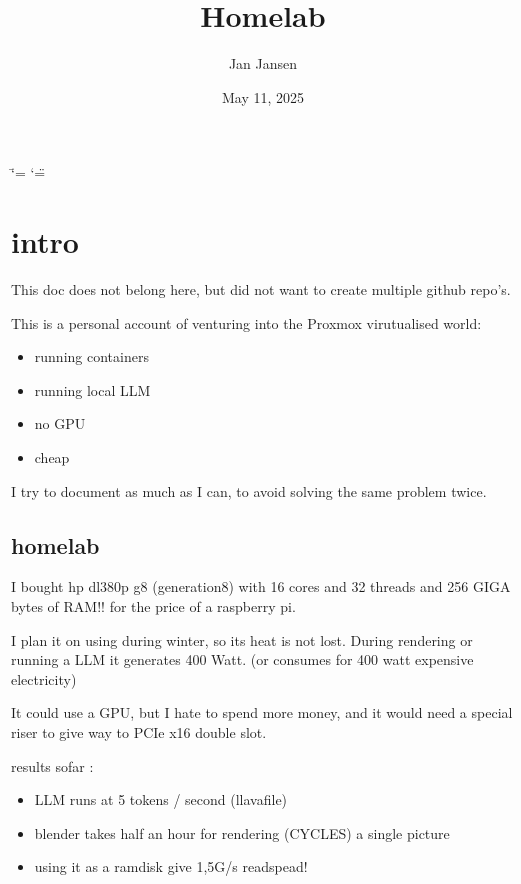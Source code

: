 \documentclass[letterpaper,10pt,english]{sphinxmanual}
\title{Homelab}
\date{May 11, 2025}
\author{Jan Jansen}
\begin{document}
\ifdefined\shorthandoff
  \ifnum\catcode`\=\string=\active\shorthandoff{=}\fi
  \ifnum\catcode`\"=\active{}\fi
\fi

\pagestyle{empty}
\sphinxmaketitle
\pagestyle{plain}
\sphinxtableofcontents
\pagestyle{normal}
\label{\detokenize{index::doc}}


\sphinxstepscope


\chapter{intro}
\label{\detokenize{intro:intro}}\label{\detokenize{intro::doc}}
\sphinxAtStartPar
This doc does not belong here, but did not want to create multiple github repo’s.

\sphinxAtStartPar
This is a personal account of venturing into the Proxmox virutualised world:
\begin{itemize}
\item {} 
\sphinxAtStartPar
running containers

\item {} 
\sphinxAtStartPar
running local LLM

\item {} 
\sphinxAtStartPar
no GPU

\item {} 
\sphinxAtStartPar
cheap

\end{itemize}

\sphinxAtStartPar
I try to document as much as I can, to avoid solving the same problem twice.


\section{homelab}
\label{\detokenize{intro:homelab}}
\sphinxAtStartPar
I bought hp dl380p g8 (generation8) with 16 cores and 32 threads and 256 GIGA bytes of RAM!! for the price of a raspberry pi.

\sphinxAtStartPar
I plan it on using during winter, so its heat is not lost. During rendering or running a LLM it generates 400 Watt. (or consumes for 400 watt expensive electricity)

\sphinxAtStartPar
It could use a GPU, but I hate to spend more money, and it would need a special riser to give way to PCIe x16 double slot.

\sphinxAtStartPar
results sofar :
\begin{itemize}
\item {} 
\sphinxAtStartPar
LLM runs at 5 tokens / second (llavafile)

\item {} 
\sphinxAtStartPar
blender takes half an hour for rendering (CYCLES) a single picture

\item {} 
\sphinxAtStartPar
using it as a  ramdisk give 1,5G/s readspead!

\end{itemize}
\end{document}

